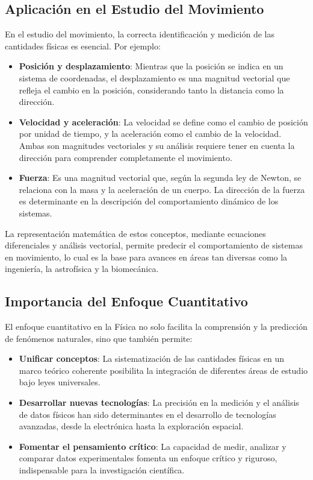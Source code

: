 \subsection{Aplicación en el Estudio del Movimiento}

En el estudio del movimiento, la correcta identificación y medición de las cantidades físicas es esencial. Por ejemplo:
\begin{itemize}
    \item \textbf{Posición y desplazamiento}: Mientras que la posición se indica en un sistema de coordenadas, el desplazamiento es una magnitud vectorial que refleja el cambio en la posición, considerando tanto la distancia como la dirección.
    \item \textbf{Velocidad y aceleración}: La velocidad se define como el cambio de posición por unidad de tiempo, y la aceleración como el cambio de la velocidad. Ambas son magnitudes vectoriales y su análisis requiere tener en cuenta la dirección para comprender completamente el movimiento.
    \item \textbf{Fuerza}: Es una magnitud vectorial que, según la segunda ley de Newton, se relaciona con la masa y la aceleración de un cuerpo. La dirección de la fuerza es determinante en la descripción del comportamiento dinámico de los sistemas.
\end{itemize}

La representación matemática de estos conceptos, mediante ecuaciones diferenciales y análisis vectorial, permite predecir el comportamiento de sistemas en movimiento, lo cual es la base para avances en áreas tan diversas como la ingeniería, la astrofísica y la biomecánica.

\subsection{Importancia del Enfoque Cuantitativo}

El enfoque cuantitativo en la Física no solo facilita la comprensión y la predicción de fenómenos naturales, sino que también permite:
\begin{itemize}
    \item \textbf{Unificar conceptos}: La sistematización de las cantidades físicas en un marco teórico coherente posibilita la integración de diferentes áreas de estudio bajo leyes universales.
    \item \textbf{Desarrollar nuevas tecnologías}: La precisión en la medición y el análisis de datos físicos han sido determinantes en el desarrollo de tecnologías avanzadas, desde la electrónica hasta la exploración espacial.
    \item \textbf{Fomentar el pensamiento crítico}: La capacidad de medir, analizar y comparar datos experimentales fomenta un enfoque crítico y riguroso, indispensable para la investigación científica.
\end{itemize}

